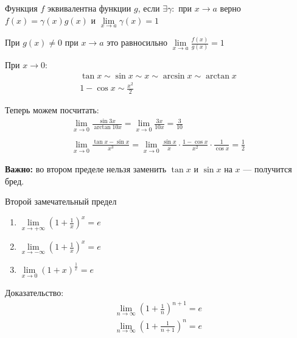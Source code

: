 \begin{defn}{}{}
    Функция \( f \) эквивалентна функции \( g \), 
    если \( \exists \gamma : \) при \( x \to a \) верно \( f(x) = \gamma(x) g(x) \) и 
    \( \lim\limits_{x \to a} \gamma (x) = 1 \)

    При \( g(x) \neq 0 \) при \( x \to a \) это равносильно \( \lim\limits_{x \to a} \frac{f(x)}{g(x)} = 1 \)
\end{defn}

\begin{example}{}{}
    При \( x \to 0 \):
    \begin{gather*}
        \tan x \sim \sin x \sim x \sim \arcsin x \sim \arctan x
        \\
        1 - \cos x \sim \frac{x^2}{2}
    \end{gather*}
\end{example}

Теперь можем посчитать:
\begin{gather*}
    \lim\limits_{x \to 0} \frac{\sin 3x}{\arctan 10x} = \lim\limits_{x \to 0} \frac{3x}{10x} = \frac{3}{10}
    \\
    \\
    \lim\limits_{x \to 0} \frac{\tan x - \sin x}{x^3}
        = \lim\limits_{x \to 0} \frac{\sin x}{x} \cdot \frac{1 - \cos x}{x^2} \cdot \frac{1}{\cos x}
            = \frac{1}{2}
\end{gather*}

\textbf{Важно:} во втором пределе нельзя заменить \( \tan x \) и \( \sin x \) на \( x \) --- получится бред.

\begin{thrm}{Второй замечательный предел}{}
    \begin{enumerate}
        \item
            \( \displaystyle \lim\limits_{x \to +\infty} \left( 1 + \frac{1}{x} \right)^x = e \)
        \item
            \( \displaystyle \lim\limits_{x \to -\infty} \left( 1 + \frac{1}{x} \right)^x = e \)
        \item 
            \( \displaystyle \lim\limits_{x \to 0} (1 + x)^{\frac{1}{x}} = e \)
    \end{enumerate}
\end{thrm}

Доказательство:
\begin{gather*}
    \lim\limits_{n \to \infty} \left( 1 + \frac{1}{n} \right)^{n + 1} = e
    \\
    \lim\limits_{n \to \infty} \left( 1 + \frac{1}{n + 1} \right)^{n} = e
\end{gather*}

